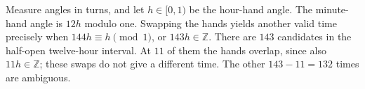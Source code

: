 Measure angles in turns, and let $h\in[0,1)$ be the hour-hand angle. The minute-hand angle is $12h$ modulo one. Swapping the hands yields another valid time precisely when $144h\equiv h\pmod1$, or $143h\in\mathbb Z$. There are $143$ candidates in the half-open twelve-hour interval. At $11$ of them the hands overlap, since also $11h\in\mathbb Z$; these swaps do not give a different time. The other $143-11=\boxed{132}$ times are ambiguous.
